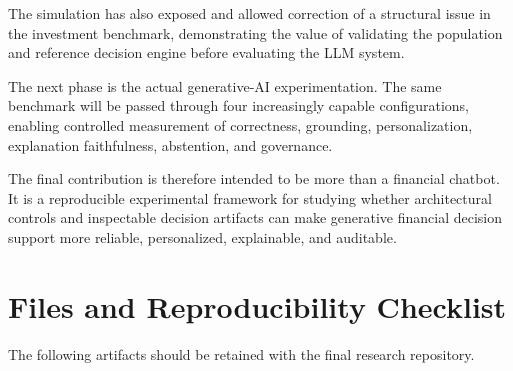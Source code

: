 \documentclass[12pt,a4paper]{article}
\begin{document}
The simulation has also exposed and allowed correction of a structural issue in the investment benchmark, demonstrating the value of validating the population and reference decision engine before evaluating the LLM system.

The next phase is the actual generative-AI experimentation. The same benchmark will be passed through four increasingly capable configurations, enabling controlled measurement of correctness, grounding, personalization, explanation faithfulness, abstention, and governance.

The final contribution is therefore intended to be more than a financial chatbot. It is a reproducible experimental framework for studying whether architectural controls and inspectable decision artifacts can make generative financial decision support more reliable, personalized, explainable, and auditable.

\appendix

\section{Files and Reproducibility Checklist}

The following artifacts should be retained with the final research repository.
\end{document}
